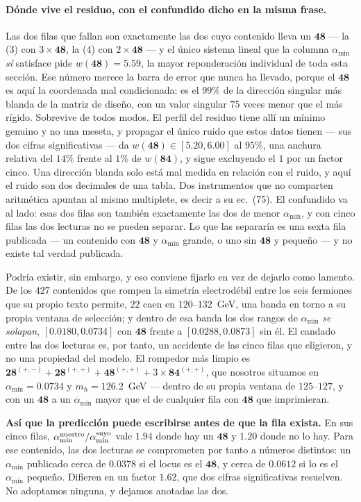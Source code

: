 \documentclass[11pt,a4paper]{article}
\newcommand{\rep}[1]{\mathbf{#1}}
\newcommand{\amin}{\alpha_{\min}}
\newenvironment{keyeq}
  {\begin{center}\setlength{\fboxsep}{9pt}\setlength{\fboxrule}{0.8pt}%
   \begin{lrbox}{\keyeqbox}\begin{minipage}{0.88\textwidth}}
  {\end{minipage}\end{lrbox}%
   \fcolorbox{hdrblue!55}{hdrblue!6}{\usebox{\keyeqbox}}\end{center}}
\begin{document}
\paragraph{Dónde vive el residuo, con el confundido dicho en la misma frase.} Las dos filas que
fallan son exactamente las dos cuyo contenido lleva un $\rep{48}$ --- la (3) con $3\times\rep{48}$,
la (4) con $2\times\rep{48}$ --- y el único sistema lineal que la columna $\amin$ \emph{sí} satisface
pide $w(\rep{48})=5.59$, la mayor reponderación individual de toda esta sección. Ese número merece la
barra de error que nunca ha llevado, porque el $\rep{48}$ es aquí la coordenada mal condicionada: es
el $99\%$ de la dirección singular más blanda de la matriz de diseño, con un valor singular $75$
veces menor que el más rígido. Sobrevive de todos modos. El perfil del residuo tiene allí un mínimo
genuino y no una meseta, y propagar el único ruido que estos datos tienen --- sus dos cifras
significativas --- da $w(\rep{48})\in[5.20,6.00]$ al $95\%$, una anchura relativa del $14\%$ frente
al $1\%$ de $w(\rep{84})$, y sigue excluyendo el $1$ por un factor cinco. Una dirección blanda solo
está mal medida en relación con el ruido, y aquí el ruido son dos decimales de una tabla. Dos
instrumentos que no comparten aritmética apuntan al mismo multiplete, es decir a su ec.~(75). El
confundido va al lado: esas dos filas son también exactamente las dos de menor $\amin$, y con cinco
filas las dos lecturas no se pueden separar. Lo que las separaría es una sexta fila publicada --- un
contenido con $\rep{48}$ y $\amin$ grande, o uno sin $\rep{48}$ y pequeño --- y no existe tal verdad
publicada.

Podría existir, sin embargo, y eso conviene fijarlo en vez de dejarlo como lamento. De los $427$
contenidos que rompen la simetría electrodébil entre los seis fermiones que su propio texto permite,
$22$ caen en $120$--$132$~GeV, una banda en torno a su propia ventana de selección; y dentro de esa
banda los dos rangos de $\amin$ \emph{se solapan}, $[0.0180,0.0734]$ con $\rep{48}$ frente a
$[0.0288,0.0873]$ sin él. El candado entre las dos lecturas es, por tanto, un accidente de las cinco
filas que eligieron, y no una propiedad del modelo. El rompedor más limpio es
$\rep{28}^{(+,-)}+\rep{28}^{(+,+)}+\rep{48}^{(+,+)}+3\times\rep{84}^{(+,+)}$, que nosotros situamos
en $\amin=0.0734$ y $m_h=126.2$~GeV --- dentro de su propia ventana de $125$--$127$, y con un
$\rep{48}$ a un $\amin$ mayor que el de cualquier fila con $\rep{48}$ que imprimieran.

\begin{keyeq}
\textbf{Así que la predicción puede escribirse antes de que la fila exista.} En sus cinco filas,
$\amin^{\rm nuestro}/\amin^{\rm suyo}$ vale $1.94$ donde hay un $\rep{48}$ y $1.20$ donde no lo hay.
Para ese contenido, las dos lecturas se comprometen por tanto a números distintos: un $\amin$
publicado cerca de $0.0378$ si el locus es el $\rep{48}$, y cerca de $0.0612$ si lo es el $\amin$
pequeño. Difieren en un factor $1.62$, que dos cifras significativas resuelven. No adoptamos ninguna,
y dejamos anotadas las dos.
\end{keyeq}
\end{document}
